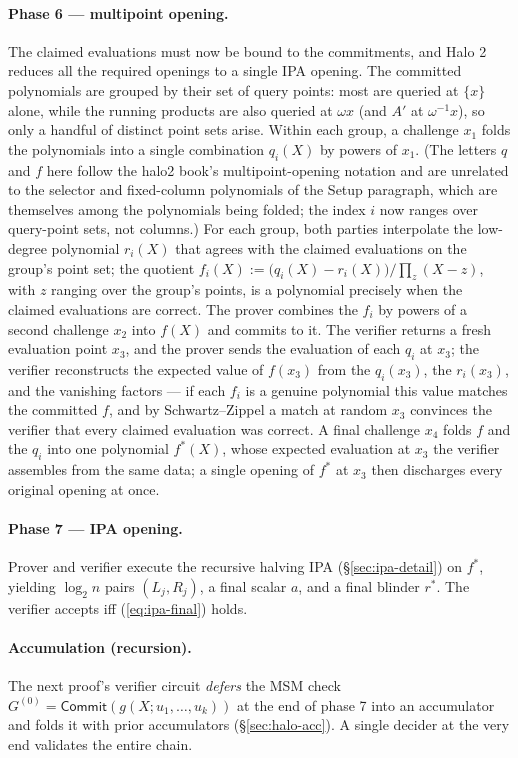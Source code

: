 \documentclass[11pt,a4paper]{article}
\theoremstyle{definition}
\newcommand{\Comm}{\mathsf{Commit}}
\begin{document}
\paragraph{Phase 6 --- multipoint opening.}
The claimed evaluations must now be bound to the commitments, and Halo 2
reduces all the required openings to a single IPA opening. The committed
polynomials are grouped by their set of query points: most are queried at
$\{x\}$ alone, while the running products are also queried at $\omega x$
(and $A'$ at $\omega^{-1} x$), so only a handful of distinct point sets
arise. Within each group, a challenge $x_1$ folds the polynomials into a
single combination $q_i(X)$ by powers of $x_1$. (The letters $q$ and $f$
here follow the halo2 book's multipoint-opening notation and are
unrelated to the selector and fixed-column polynomials of the Setup
paragraph, which are themselves among the polynomials being folded; the
index $i$ now ranges over query-point sets, not columns.) For each group, both
parties interpolate the low-degree polynomial $r_i(X)$ that agrees with
the claimed evaluations on the group's point set; the quotient
$f_i(X) := \bigl(q_i(X) - r_i(X)\bigr) / \prod_{z}(X - z)$, with $z$
ranging over the group's points, is a polynomial precisely when the
claimed evaluations are correct. The prover combines the $f_i$ by powers
of a second challenge $x_2$ into $f(X)$ and commits to it. The verifier
returns a fresh evaluation point $x_3$, and the prover sends the
evaluation of each $q_i$ at $x_3$; the verifier reconstructs the expected
value of $f(x_3)$ from the $q_i(x_3)$, the $r_i(x_3)$, and the vanishing
factors --- if each $f_i$ is a genuine polynomial this value matches the
committed $f$, and by Schwartz--Zippel a match at random $x_3$ convinces
the verifier that every claimed evaluation was correct. A final challenge
$x_4$ folds $f$ and the $q_i$ into one polynomial $f^*(X)$, whose
expected evaluation at $x_3$ the verifier assembles from the same data;
a single opening of $f^*$ at $x_3$ then discharges every original
opening at once.

\paragraph{Phase 7 --- IPA opening.}
Prover and verifier execute the recursive halving IPA
(\S\ref{sec:ipa-detail}) on $f^*$, yielding $\log_2 n$ pairs $(L_j, R_j)$,
a final scalar $a$, and a final blinder $r^*$. The verifier accepts iff
(\ref{eq:ipa-final}) holds.

\paragraph{Accumulation (recursion).}
The next proof's verifier circuit \emph{defers} the MSM check
$G^{(0)} = \Comm(g(X; u_1, \dots, u_k))$ at the end of
phase 7 into an accumulator and folds it with prior
accumulators (\S\ref{sec:halo-acc}).
A single decider at the very end validates the entire chain.
\end{document}
